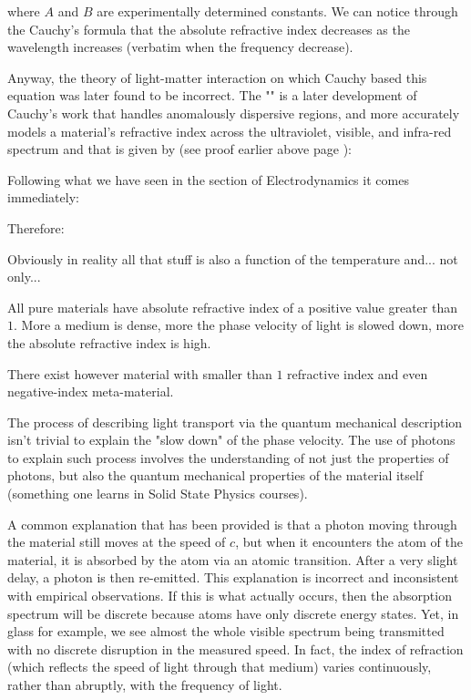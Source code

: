 	where $A$ and $B$ are experimentally determined constants. We can notice through the Cauchy's formula that the absolute refractive index decreases as the wavelength increases (verbatim when the frequency decrease).
	
	Anyway, the theory of light-matter interaction on which Cauchy based this equation was later found to be incorrect. The  ""  is a later development of Cauchy's work that handles anomalously dispersive regions, and more accurately models a material's refractive index across the ultraviolet, visible, and infra-red spectrum and that is given by (see proof earlier above page \pageref{Sellmeier equation}):
	
	Following what we have seen in the section of Electrodynamics it comes immediately:
	
	Therefore:
	
	\begin{tcolorbox}[title=Remark,colframe=black,arc=10pt]
	Obviously in reality all that stuff is also a function of the temperature and... not only...
	\end{tcolorbox}	
	All pure materials have absolute refractive index of a positive value greater than $1$. More a medium is dense, more the phase velocity of light is slowed down, more the absolute refractive index is high.
	\begin{tcolorbox}[title=Remark,colframe=black,arc=10pt]
	There exist however material with smaller than $1$ refractive index and even negative-index meta-material.
	\end{tcolorbox}	
	The process of describing light transport via the quantum mechanical description isn't trivial to explain the "slow down" of the phase velocity. The use of photons to explain such process involves the understanding of not just the properties of photons, but also the quantum mechanical properties of the material itself (something one learns in Solid State Physics courses).

	A common explanation that has been provided is that a photon moving through the material still moves at the speed of $c$, but when it encounters the atom of the material, it is absorbed by the atom via an atomic transition. After a very slight delay, a photon is then re-emitted. This explanation is incorrect and inconsistent with empirical observations. If this is what actually occurs, then the absorption spectrum will be discrete because atoms have only discrete energy states. Yet, in glass for example, we see almost the whole visible spectrum being transmitted with no discrete disruption in the measured speed. In fact, the index of refraction (which reflects the speed of light through that medium) varies continuously, rather than abruptly, with the frequency of light.

